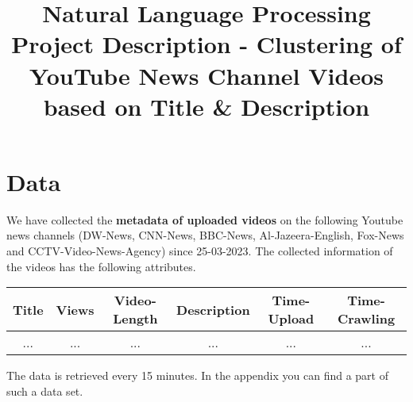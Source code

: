 \documentclass[12pt,a4paper]{scrartcl}
\title{\textbf{Natural Language Processing} \\[0.5em] \large{\textbf{Project Description - Clustering of YouTube News Channel Videos based on Title \& Description} \\[0.5em]} }
\date{}
\begin{document}
\maketitle
\section{Data}
We have collected the \textbf{metadata of uploaded videos} on the following Youtube news channels (DW-News, CNN-News, BBC-News, Al-Jazeera-English, Fox-News and CCTV-Video-News-Agency) since 25-03-2023. The collected information of the videos has the following attributes.\\
\begin{center}
\begin{tabular}{ |c|c|c|c|c|c| } 
 \hline
 Title & Views & Video-Length & Description & Time-Upload & Time-Crawling \\ 
 \hline
 ... & ... & ... & ... & ... & ... \\
 \hline
\end{tabular}
\end{center}
The data is retrieved every 15 minutes. In the appendix you can find a part of such a data set.
\end{document}
